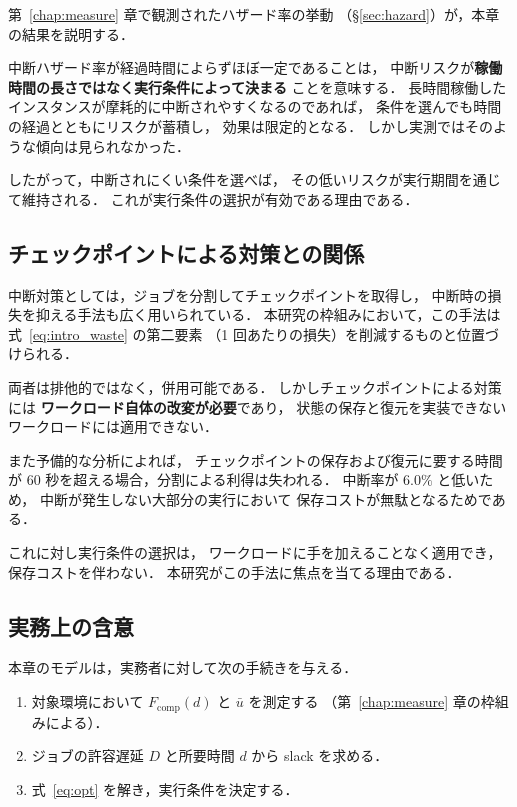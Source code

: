 \documentclass[11pt,a4paper]{ltjsreport}
\newcommand{\Fcomp}{F_{\mathrm{comp}}}
\begin{document}
第~\ref{chap:measure} 章で観測されたハザード率の挙動
（\S\ref{sec:hazard}）が，本章の結果を説明する．

中断ハザード率が経過時間によらずほぼ一定であることは，
中断リスクが\textbf{稼働時間の長さではなく実行条件によって決まる}
ことを意味する．
長時間稼働したインスタンスが摩耗的に中断されやすくなるのであれば，
条件を選んでも時間の経過とともにリスクが蓄積し，
効果は限定的となる．
しかし実測ではそのような傾向は見られなかった．

したがって，中断されにくい条件を選べば，
その低いリスクが実行期間を通じて維持される．
これが実行条件の選択が有効である理由である．

\subsection{チェックポイントによる対策との関係}
\label{sec:checkpoint_discussion}

中断対策としては，ジョブを分割してチェックポイントを取得し，
中断時の損失を抑える手法も広く用いられている．
本研究の枠組みにおいて，この手法は
式~\eqref{eq:intro_waste} の第二要素
（1 回あたりの損失）を削減するものと位置づけられる．

両者は排他的ではなく，併用可能である．
しかしチェックポイントによる対策には
\textbf{ワークロード自体の改変が必要}であり，
状態の保存と復元を実装できないワークロードには適用できない．

また予備的な分析によれば，
チェックポイントの保存および復元に要する時間が
60 秒を超える場合，分割による利得は失われる．
中断率が $6.0\%$ と低いため，
中断が発生しない大部分の実行において
保存コストが無駄となるためである．

これに対し実行条件の選択は，
ワークロードに手を加えることなく適用でき，
保存コストを伴わない．
本研究がこの手法に焦点を当てる理由である．

\subsection{実務上の含意}

本章のモデルは，実務者に対して次の手続きを与える．

\begin{enumerate}
  \item 対象環境において $\Fcomp(d)$ と $\bar u$ を測定する
        （第~\ref{chap:measure} 章の枠組みによる）．
  \item ジョブの許容遅延 $D$ と所要時間 $d$ から slack を求める．
  \item 式~\eqref{eq:opt} を解き，実行条件を決定する．
\end{enumerate}
\end{document}
